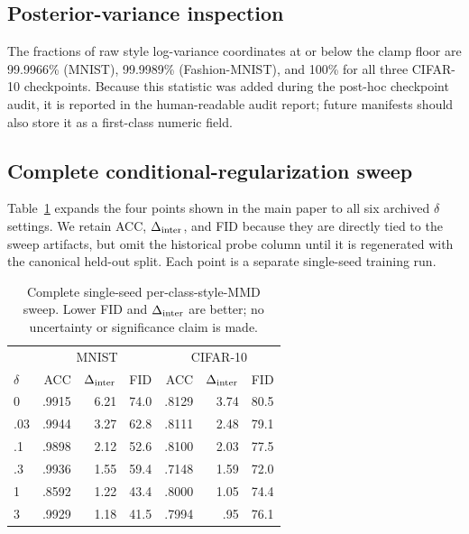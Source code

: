 \subsection{Posterior-variance inspection}

The fractions of raw style log-variance coordinates at or below the clamp
floor are 99.9966\% (MNIST), 99.9989\% (Fashion-MNIST), and 100\% for all
three CIFAR-10 checkpoints.  Because this statistic was added during the
post-hoc checkpoint audit, it is reported in the human-readable audit report;
future manifests should also store it as a first-class numeric field.

\subsection{Complete conditional-regularization sweep}

Table~\ref{tab:full-delta-sweep} expands the four points shown in the main
paper to all six archived $\delta$ settings.  We retain ACC, $\Delta_{\mathrm{inter}}$, and
FID because they are directly tied to the sweep artifacts, but omit the
historical probe column until it is regenerated with the canonical held-out
split.  Each point is a separate single-seed training run.

\begin{table}[ht]
\caption{Complete single-seed per-class-style-MMD sweep.  Lower FID and
$\Delta_{\mathrm{inter}}$ are better; no uncertainty or significance claim is made.}
\label{tab:full-delta-sweep}
\centering
\small
\setlength{\tabcolsep}{4pt}
\begin{tabular}{lrrrrrr}
\toprule
& \multicolumn{3}{c}{MNIST} & \multicolumn{3}{c}{CIFAR-10} \\
$\delta$ & ACC & $\Delta_{\mathrm{inter}}$ & FID & ACC & $\Delta_{\mathrm{inter}}$ & FID \\
\midrule
0    & .9915 & 6.21 & 74.0 & .8129 & 3.74 & 80.5 \\
.03  & .9944 & 3.27 & 62.8 & .8111 & 2.48 & 79.1 \\
.1   & .9898 & 2.12 & 52.6 & .8100 & 2.03 & 77.5 \\
.3   & .9936 & 1.55 & 59.4 & .7148 & 1.59 & 72.0 \\
1    & .8592 & 1.22 & 43.4 & .8000 & 1.05 & 74.4 \\
3    & .9929 & 1.18 & 41.5 & .7994 & .95  & 76.1 \\
\bottomrule
\end{tabular}
\end{table}

\FloatBarrier

